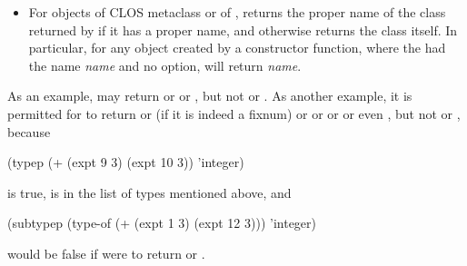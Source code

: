\begin{defun}[Function]
\begin{new}
\begin{itemize}
\item
For objects of CLOS metaclass  or of ,
 returns the proper name of the class returned by 
if it has a proper name, and otherwise returns the class itself.
In particular,
for any object created by a  constructor function,
where the  had the name \emph{name} and no  option,
 will return \emph{name}.
\end{itemize}

As an example, 
may return  or  or ,
but not  or .
As another example, it is permitted for
 to return
 or  (if it is indeed a fixnum) or
 or  or 
or even , but not  or , because
\begin{lisp}
(typep (+ (expt 9 3) (expt 10 3)) 'integer)
\end{lisp}
is true,  is in the list of types mentioned above, and
\begin{lisp}
(subtypep (type-of (+ (expt 1 3) (expt 12 3))) 'integer)
\end{lisp}
would be false if  were to return  or .
\end{new}
\end{defun}


